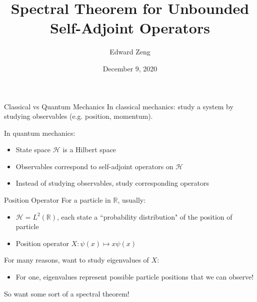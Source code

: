 \documentclass{beamer}
\title[Spectral Theorem]{Spectral Theorem for Unbounded Self-Adjoint Operators}
\author[E. Zeng]{Edward Zeng}
\institute[UC Berkeley]{University of California, Berkeley \protect\\ DRP}
\date{December 9, 2020}
\theoremstyle{plain}
\theoremstyle{definition}
\newcommand{\cH}{{\mathcal H}}
\newcommand{\bR}{{\mathbb R}}
\begin{document}
\maketitle

\begin{frame}{Classical vs Quantum Mechanics}
    In classical mechanics: study a system by studying observables (e.g. position, momentum).

    \bigskip
    In quantum mechanics:
    \begin{itemize}
        \item State space $\cH$ is a Hilbert space
        \item Observables correspond to self-adjoint operators on $\cH$
        \item Instead of studying observables, study corresponding operators
    \end{itemize}
\end{frame}

\begin{frame}{Position Operator}
    For a particle in $\bR$, usually:
    \begin{itemize}
        \item $\cH = L^2(\bR)$, each state a ``probability distribution" of the position of particle
        \item Position operator $X: \psi(x) \mapsto x\psi(x)$
    \end{itemize}

    \pause
    \bigskip
    For many reasons, want to study eigenvalues of $X$:
    \begin{itemize}
        \item For one, eigenvalues represent possible particle positions that we can observe!
    \end{itemize}
    So want some sort of a spectral theorem!
\end{frame}
\end{document}
